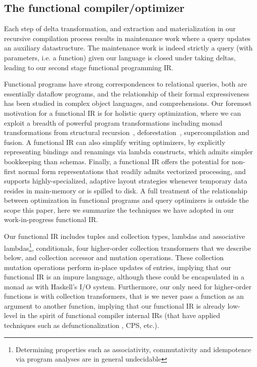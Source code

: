 \subsection{The functional compiler/optimizer}
\label{sec:kthree}



\def\map{\mbox{\texttt{map}}}
\def\flatten{\mbox{\texttt{flatten}}}
\def\agg{\mbox{\texttt{agg}}}
\def\groupagg{\mbox{\texttt{groupagg}}}
\def\apply{\mbox{\texttt{apply}}}



Each step of delta transformation, and extraction and materialization in our
recursive compilation process results in maintenance work where a query updates
an auxiliary datastructure. The maintenance work is indeed strictly a query
(with parameters, i.e. a function) given our language is closed under taking
deltas, leading to our second stage functional programming IR.



Functional programs have strong correspondences to relational queries, both are
essentially dataflow programs, and the relationship of their formal
expressiveness has been studied in complex object languages, and comprehensions.
Our foremost motivation for a functional IR is for holistic query optimization,
where we can exploit a breadth of powerful program transformations including
monad transformations from structural recursion~,
deforestation~, supercompilation  and
fusion.
A functional IR can also simplify writing optimizers, by explicitly representing
bindings and renamings via lambda constructs, which admits simpler bookkeeping
than schemas. Finally, a functional IR offers the potential for non-first normal
form representations that readily admits vectorized processing, and supports
highly-specialized, adaptive layout strategies whenever temporary data resides
in main-memory or is spilled to disk. A full treatment of the relationship
between optimization in functional programs and query optimizers is outside the
scope this paper, here we summarize the techniques we have adopted in our
work-in-progress functional IR.


Our functional IR includes tuples and collection types, lambdas and associative
lambdas\footnote{Determining properties such as associativity, commutativity and
idempotence via program analyses are in general undecidable },
conditionals, four higher-order collection transformers that we describe below,
and collection accessor and mutation operations. These collection mutation
operations perform in-place updates of entries, implying that our functional IR
is an impure language, although these could be encapsulated in a monad as with
Haskell's I/O system. Furthermore, our only need for higher-order functions is
with collection transformers, that is we never pass a function as an argument to
another function, implying that our functional IR is already low-level in the
spirit of functional compiler internal IRs (that have applied techniques such as
defunctionalization , CPS, etc.).



